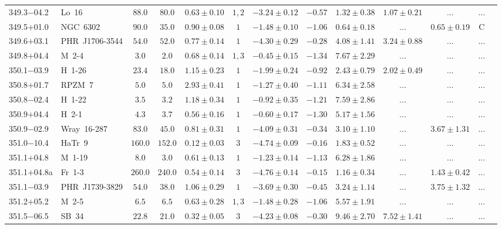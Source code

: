 \documentclass[useAMS]{mn2e}
\begin{document}
\begin{center}
{\begin{longtable}{llccccccccccc}
349.3$-$04.2&Lo~16&$      88.0$&$      80.0$&$0.63 \pm 0.10$&$1,2$&$-3.24 \pm 0.12$&$     -0.57$&$1.32 \pm 0.38$&$1.07 \pm 0.21$&$...$&...\\
349.5$+$01.0&NGC~6302&$      90.0$&$      35.0$&$0.90 \pm 0.08$&$1$&$-1.48 \pm 0.10$&$     -1.06$&$0.64 \pm 0.18$&$...$&$0.65 \pm 0.19$&C\\
349.6$+$03.1&PHR~J1706-3544&$      54.0$&$      52.0$&$0.77 \pm 0.14$&$1$&$-4.30 \pm 0.29$&$     -0.28$&$4.08 \pm 1.41$&$3.24 \pm 0.88$&$...$&...\\
349.8$+$04.4&M~2-4&$       3.0$&$       2.0$&$0.68 \pm 0.14$&$1,3$&$-0.45 \pm 0.15$&$     -1.34$&$7.67 \pm 2.29$&$...$&$...$&...\\
350.1$-$03.9&H~1-26&$      23.4$&$      18.0$&$1.15 \pm 0.23$&$1$&$-1.99 \pm 0.24$&$     -0.92$&$2.43 \pm 0.79$&$2.02 \pm 0.49$&$...$&...\\
350.8$+$01.7&RPZM~7&$       5.0$&$       5.0$&$2.93 \pm 0.41$&$1$&$-1.27 \pm 0.40$&$     -1.11$&$6.34 \pm 2.58$&$...$&$...$&...\\
350.8$-$02.4&H~1-22&$       3.5$&$       3.2$&$1.18 \pm 0.34$&$1$&$-0.92 \pm 0.35$&$     -1.21$&$7.59 \pm 2.86$&$...$&$...$&...\\
350.9$+$04.4&H~2-1&$       4.3$&$       3.7$&$0.56 \pm 0.16$&$1$&$-0.60 \pm 0.17$&$     -1.30$&$5.17 \pm 1.56$&$...$&$...$&...\\
350.9$-$02.9&Wray~16-287&$      83.0$&$      45.0$&$0.81 \pm 0.31$&$1$&$-4.09 \pm 0.31$&$     -0.34$&$3.10 \pm 1.10$&$...$&$3.67 \pm 1.31$&...\\
351.0$-$10.4&HaTr~9&$     160.0$&$     152.0$&$0.12 \pm 0.03$&$3$&$-4.74 \pm 0.09$&$     -0.16$&$1.83 \pm 0.52$&$...$&$...$&...\\
351.1$+$04.8&M~1-19&$       8.0$&$       3.0$&$0.61 \pm 0.13$&$1$&$-1.23 \pm 0.14$&$     -1.13$&$6.28 \pm 1.86$&$...$&$...$&...\\
351.1$+$04.8a&Fr~1-3&$     260.0$&$     240.0$&$0.54 \pm 0.14$&$3$&$-4.76 \pm 0.14$&$     -0.15$&$1.16 \pm 0.34$&$...$&$1.43 \pm 0.42$&...\\
351.1$-$03.9&PHR~J1739-3829&$      54.0$&$      38.0$&$1.06 \pm 0.29$&$1$&$-3.69 \pm 0.30$&$     -0.45$&$3.24 \pm 1.14$&$...$&$3.75 \pm 1.32$&...\\
351.2$+$05.2&M~2-5&$       6.5$&$       6.5$&$0.63 \pm 0.28$&$1,3$&$-1.48 \pm 0.28$&$     -1.06$&$5.57 \pm 1.91$&$...$&$...$&...\\
351.5$-$06.5&SB~34&$      22.8$&$      21.0$&$0.32 \pm 0.05$&$3$&$-4.23 \pm 0.08$&$     -0.30$&$9.46 \pm 2.70$&$7.52 \pm 1.41$&$...$&...\\

\end{longtable}}
\end{center}
\end{document}
